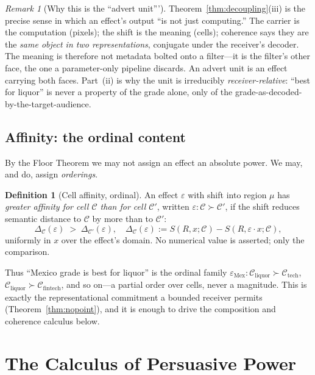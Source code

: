 \documentclass[twocolumn,11pt,a4paper]{article}
\theoremstyle{adv}
\theoremstyle{definition}
\newtheorem{definition}[theorem]{Definition}
\theoremstyle{remark}
\newtheorem{remark}[theorem]{Remark}
\newcommand{\Cell}{\mathcal{C}}        %
\newcommand{\Recv}{R}                  %
\newcommand{\Sval}{S}                  %
\newcommand{\Eff}{\varepsilon}        %
\begin{document}
\begin{remark}[Why this is the ``advert unit''']
\label{rem:advertunit}
Theorem~\ref{thm:decoupling}(iii) is the precise sense in which an effect's
output ``is not just computing.'' The carrier is the computation (pixels);
the shift is the meaning (cells); coherence says they are the \emph{same
object in two representations}, conjugate under the receiver's decoder. The
meaning is therefore not metadata bolted onto a filter---it is the filter's
other face, the one a parameter-only pipeline discards. An advert unit is an
effect carrying both faces. Part~(ii) is why the unit is irreducibly
\emph{receiver-relative}: ``best for liquor'' is never a property of the
grade alone, only of the grade-as-decoded-by-the-target-audience.
\end{remark}

\subsection{Affinity: the ordinal content}

By the Floor Theorem we may not assign an effect an absolute power. We may,
and do, assign \emph{orderings}.

\begin{definition}[Cell affinity, ordinal]
\label{def:affinity}
An effect $\Eff$ with shift into region $\mu$ has \emph{greater affinity
for cell $\Cell$ than for cell $\Cell'$}, written
$\Eff:\Cell\succ\Cell'$, if the shift reduces semantic distance to $\Cell$
by more than to $\Cell'$:
\[
  \Delta_\Cell(\Eff) \;>\; \Delta_{\Cell'}(\Eff),\quad
  \Delta_\Cell(\Eff):=\Sval(\Recv,x;\Cell)-\Sval(\Recv,\Eff\!\cdot x;\Cell),
\]
uniformly in $x$ over the effect's domain. No numerical value is asserted;
only the comparison.
\end{definition}

Thus ``Mexico grade is best for liquor'' is the ordinal family
$\Eff_{\text{Mex}}:\Cell_{\text{liquor}}\succ\Cell_{\text{tech}}$,
$\Cell_{\text{liquor}}\succ\Cell_{\text{fintech}}$, and so on---a partial
order over cells, never a magnitude. This is exactly the representational
commitment a bounded receiver permits (Theorem~\ref{thm:nopoint}), and it
is enough to drive the composition and coherence calculus below.

\section{The Calculus of Persuasive Power}
\label{sec:power}
\end{document}
